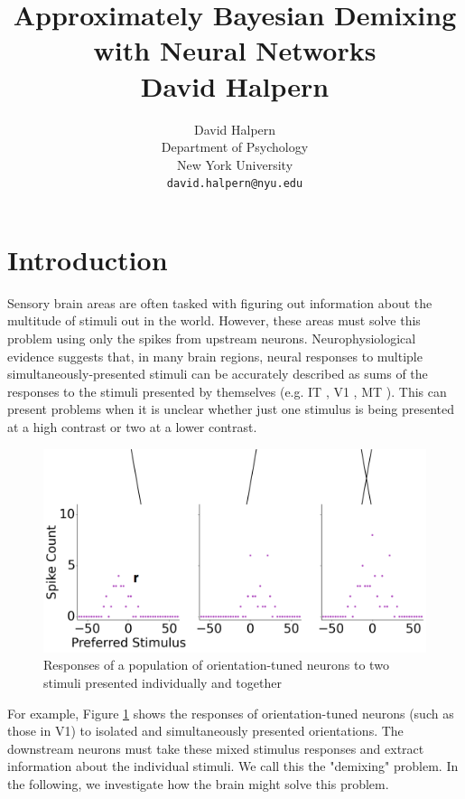 \documentclass{article} %
\title{Approximately Bayesian Demixing with Neural Networks \\ David Halpern}
\author{
David Halpern\\
Department of Psychology\\
New York University\\
\texttt{david.halpern@nyu.edu} \\
}
\begin{document}
\maketitle


\section{Introduction}
Sensory brain areas are often tasked with figuring out information about the multitude of stimuli out in the world. However, these areas must solve this problem using only the spikes from upstream neurons. Neurophysiological evidence suggests that, in many brain regions, neural responses to multiple simultaneously-presented stimuli can be accurately described as sums of the responses to the stimuli presented by themselves (e.g. IT \cite{Zoccolan07112007}, V1 \cite{Busse2009}, MT \cite{Britten15061999}). This can present problems when it is unclear whether just one stimulus is being presented at a high contrast or two at a lower contrast. 
\begin{figure}[h]
\centering
\includegraphics[width = \textwidth]{Neural_Response.png}
\caption{Responses of a population of orientation-tuned neurons to two stimuli presented individually and together}
\label{Neural_Response}
\end{figure}
For example, Figure \ref{Neural_Response} shows the responses of orientation-tuned neurons (such as those in V1) to isolated and simultaneously presented orientations. The downstream neurons must take these mixed stimulus responses and extract information about the individual stimuli. We call this the "demixing" problem. In the following, we investigate how the brain might solve this problem.
\\
\end{document}
